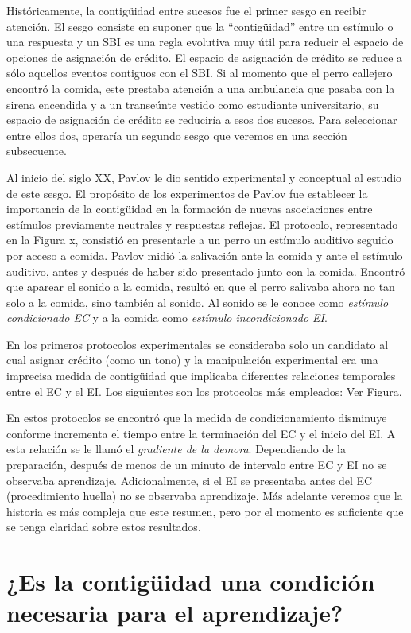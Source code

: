\documentclass[
  letterpaper,
]{book}
\begin{document}
Históricamente, la contigüidad entre sucesos fue el primer sesgo en
recibir atención. El sesgo consiste en suponer que la ``contigüidad''
entre un estímulo o una respuesta y un SBI es una regla evolutiva muy
útil para reducir el espacio de opciones de asignación de crédito. El
espacio de asignación de crédito se reduce a sólo aquellos eventos
contiguos con el SBI. Si al momento que el perro callejero encontró la
comida, este prestaba atención a una ambulancia que pasaba con la sirena
encendida y a un transeúnte vestido como estudiante universitario, su
espacio de asignación de crédito se reduciría a esos dos sucesos. Para
seleccionar entre ellos dos, operaría un segundo sesgo que veremos en
una sección subsecuente.

Al inicio del siglo XX, Pavlov le dio sentido experimental y conceptual
al estudio de este sesgo. El propósito de los experimentos de Pavlov fue
establecer la importancia de la contigüidad en la formación de nuevas
asociaciones entre estímulos previamente neutrales y respuestas
reflejas. El protocolo, representado en la Figura x, consistió en
presentarle a un perro un estímulo auditivo seguido por acceso a comida.
Pavlov midió la salivación ante la comida y ante el estímulo auditivo,
antes y después de haber sido presentado junto con la comida. Encontró
que aparear el sonido a la comida, resultó en que el perro salivaba
ahora no tan solo a la comida, sino también al sonido. Al sonido se le
conoce como \emph{estímulo condicionado EC } y a la comida como
\emph{estímulo incondicionado EI}.

En los primeros protocolos experimentales se consideraba solo un
candidato al cual asignar crédito (como un tono) y la manipulación
experimental era una imprecisa medida de contigüidad que implicaba
diferentes relaciones temporales entre el EC y el EI. Los siguientes son
los protocolos más empleados: Ver Figura.

En estos protocolos se encontró que la medida de condicionamiento
disminuye conforme incrementa el tiempo entre la terminación del EC y el
inicio del EI. A esta relación se le llamó el \emph{gradiente de la
demora}. Dependiendo de la preparación, después de menos de un minuto de
intervalo entre EC y EI no se observaba aprendizaje. Adicionalmente, si
el EI se presentaba antes del EC (procedimiento huella) no se observaba
aprendizaje. Más adelante veremos que la historia es más compleja que
este resumen, pero por el momento es suficiente que se tenga claridad
sobre estos resultados.

\section{¿Es la contigüidad una condición necesaria para el
aprendizaje?}\label{es-la-contiguxfcidad-una-condiciuxf3n-necesaria-para-el-aprendizaje}
\end{document}
